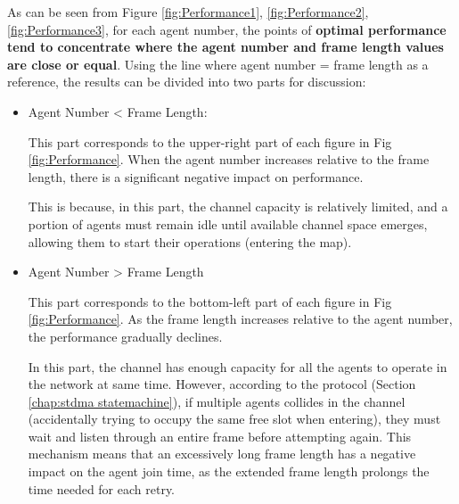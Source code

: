 As can be seen from Figure \ref{fig:Performance1}, \ref{fig:Performance2}, \ref{fig:Performance3}, for each agent number, 
the points of \textbf{optimal performance tend to concentrate where the agent number and frame length values are close or equal}. 
Using the line where agent number = frame length as a reference, the results can be divided into two parts for discussion:

\begin{itemize}
    \item Agent Number < Frame Length:
    
    This part corresponds to the upper-right part of each figure in  Fig \ref{fig:Performance}. 
    When the agent number increases relative to the frame length, there is a significant negative impact on performance.
    
    This is because, in this part, the channel capacity is relatively limited, and a portion of agents must remain idle until available channel space emerges, allowing them to start their operations (entering the map).
    
    \item Agent Number > Frame Length
    
    This part corresponds to the bottom-left part of each figure in Fig \ref{fig:Performance}. 
    As the frame length increases relative to the agent number, the performance gradually declines.
   

    In this part, the channel has enough capacity for all the agents to operate in the network at same time. 
    However, according to the protocol (Section \ref{chap:stdma statemachine}), if multiple agents collides in the channel (accidentally trying to occupy the same free slot when entering), they must wait and listen through an entire frame before attempting again. 
    This mechanism means that an excessively long frame length has a negative impact on the agent join time, as the extended frame length prolongs the time needed for each retry.

\end{itemize}


